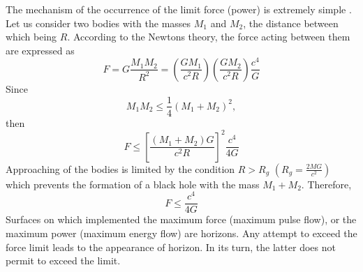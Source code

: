 \documentclass [12pt]{article}
\begin{document}
The mechanism of the occurrence of the limit force (power) is extremely simple \cite{s13}. Let us consider two bodies with the masses  ${M_1}$ and ${M_2}$, the distance between  which being $R$. According to the Newtons theory, the force  acting between them  are expressed as
\begin{equation}\label{e4}
  F = G\frac{{{M_1}{M_2}}}{{{R^2}}} = \left( {\frac{{G{M_1}}}{{{c^2}R}}} \right)\left( {\frac{{G{M_2}}}{{{c^2}R}}} \right)\frac{{{c^4}}}{G}
\end{equation}
Since
 \[{M_1}{M_2} \le \frac{1}{4}{({M_1} + {M_2})^2} ,\]
then
\begin{equation}\label{e5}
  F \le {\left[ {\frac{{\left( {{M_1} + {M_2}} \right)G}}{{{c^2}R}}} \right]^2}\frac{{{c^4}}}{{4G}}
\end{equation}
Approaching of the bodies is limited by the condition  $R > {R_g}$ $\left(R_g =\frac{2MG}{c^2} \right)$ which prevents  the formation of a black hole with the mass  ${M_1} + {M_2}$. Therefore,
\begin{equation}\label{e6}
  F \le \frac{{{c^4}}}{{4G}}
\end{equation}
Surfaces on which implemented the maximum force (maximum pulse flow), or the maximum power (maximum energy flow) are horizons. Any attempt to exceed  the force limit leads to the appearance of  horizon. In its turn, the latter does not permit to exceed the limit.
\end{document}
